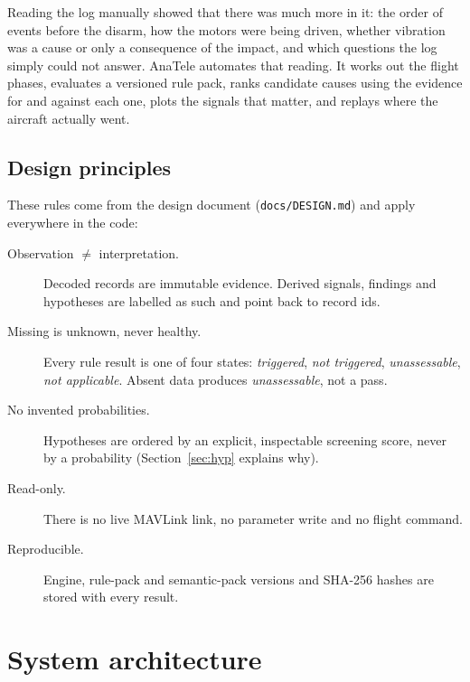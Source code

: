 \documentclass[11pt,a4paper]{article}
\newcommand{\code}[1]{\texttt{#1}}
\begin{document}
Reading the log manually showed that there was much more in it: the order of events before the
disarm, how the motors were being driven, whether vibration was a cause or only a consequence of
the impact, and which questions the log simply could not answer. AnaTele automates that reading.
It works out the flight phases, evaluates a versioned rule pack, ranks candidate causes using the
evidence for and against each one, plots the signals that matter, and replays where the aircraft
actually went.

\subsection{Design principles}
These rules come from the design document (\code{docs/DESIGN.md}) and apply everywhere in the code:

\begin{description}
  \item[Observation $\neq$ interpretation.] Decoded records are immutable evidence. Derived
        signals, findings and hypotheses are labelled as such and point back to record ids.
  \item[Missing is unknown, never healthy.] Every rule result is one of four states:
        \emph{triggered}, \emph{not triggered}, \emph{unassessable}, \emph{not applicable}.
        Absent data produces \emph{unassessable}, not a pass.
  \item[No invented probabilities.] Hypotheses are ordered by an explicit, inspectable screening
        score, never by a probability (Section~\ref{sec:hyp} explains why).
  \item[Read-only.] There is no live MAVLink link, no parameter write and no flight command.
  \item[Reproducible.] Engine, rule-pack and semantic-pack versions and SHA-256 hashes are stored
        with every result.
\end{description}

\section{System architecture}
\end{document}

